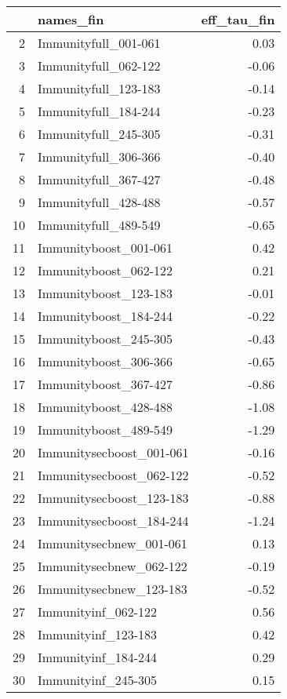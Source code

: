 \begin{table}[ht]
\centering
\begin{tabular}{rlr}
  \hline
 & names\_fin & eff\_tau\_fin \\ 
  \hline
2 & Immunityfull\_001-061 & 0.03 \\ 
  3 & Immunityfull\_062-122 & -0.06 \\ 
  4 & Immunityfull\_123-183 & -0.14 \\ 
  5 & Immunityfull\_184-244 & -0.23 \\ 
  6 & Immunityfull\_245-305 & -0.31 \\ 
  7 & Immunityfull\_306-366 & -0.40 \\ 
  8 & Immunityfull\_367-427 & -0.48 \\ 
  9 & Immunityfull\_428-488 & -0.57 \\ 
  10 & Immunityfull\_489-549 & -0.65 \\ 
  11 & Immunityboost\_001-061 & 0.42 \\ 
  12 & Immunityboost\_062-122 & 0.21 \\ 
  13 & Immunityboost\_123-183 & -0.01 \\ 
  14 & Immunityboost\_184-244 & -0.22 \\ 
  15 & Immunityboost\_245-305 & -0.43 \\ 
  16 & Immunityboost\_306-366 & -0.65 \\ 
  17 & Immunityboost\_367-427 & -0.86 \\ 
  18 & Immunityboost\_428-488 & -1.08 \\ 
  19 & Immunityboost\_489-549 & -1.29 \\ 
  20 & Immunitysecboost\_001-061 & -0.16 \\ 
  21 & Immunitysecboost\_062-122 & -0.52 \\ 
  22 & Immunitysecboost\_123-183 & -0.88 \\ 
  23 & Immunitysecboost\_184-244 & -1.24 \\ 
  24 & Immunitysecbnew\_001-061 & 0.13 \\ 
  25 & Immunitysecbnew\_062-122 & -0.19 \\ 
  26 & Immunitysecbnew\_123-183 & -0.52 \\ 
  27 & Immunityinf\_062-122 & 0.56 \\ 
  28 & Immunityinf\_123-183 & 0.42 \\ 
  29 & Immunityinf\_184-244 & 0.29 \\ 
  30 & Immunityinf\_245-305 & 0.15 \\ 

\end{tabular}
\end{table}
